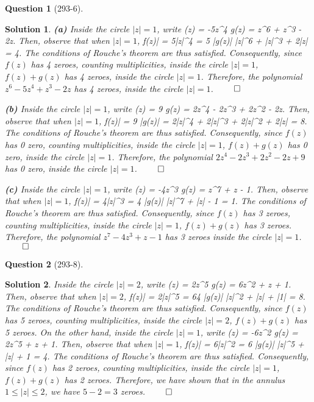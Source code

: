 \documentclass{article} %
\def\eQb#1\eQe{\begin{eqnarray*}#1\end{eqnarray*}}
\theoremstyle{quest}
\newtheorem*{question}{Question}
\newtheorem*{solution}{Solution}
\begin{document}
\begin{question}[293-6]
\end{question}
\begin{solution}
\textbf{(a)}
Inside the circle $|z| = 1$, write 
\eQb
f(z) = -5z^4 \>  \> g(z) = z^6 + z^3 - 2z.
\eQe
Then, observe that when $|z| = 1$,
\eQb
|f(z)| = 5|z|^4 = 5 \>  \> |g(z)| \leq |z|^6 + |z|^3 + 2|z| = 4.
\eQe
The conditions of Rouche's theorem are thus satisfied. Consequently, 
since $f(z)$ has 4 zeroes, counting multiplicities, inside the circle $|z| 
=1$, $f(z) + g(z)$ has 4 zeroes, inside the circle $|z| = 1$.
Therefore, the polynomial $z^6 -
5z^4 + z^3 - 2z$ has 4 zeroes, inside the circle $|z| = 1$.
\hfill $\qed$

\smallskip

\textbf{(b)}
Inside the circle $|z| = 1$, write
\eQb
f(z) = 9 \>  \> g(z) = 2z^4 - 2z^3 + 2z^2 - 2z.
\eQe 
Then, observe that when $|z| = 1$,
\eQb
|f(z)| = 9 \>  \> |g(z)| = 2|z|^4 + 2|z|^3 + 2|z|^2 + 2|z| = 8.
\eQe
The conditions of Rouche's theorem are thus satisfied. Consequently,
since $f(z)$ has 0 zero, counting multiplicities, inside the circle $|z| = 1$,
$f(z) + g(z)$ has 0 zero, inside the circle $|z| = 1$. Therefore, 
the polynomial $2z^4 - 2z^3 + 2z^2 - 2z + 9$ has 0 zero, inside
the circle $|z| = 1$.
\hfill $\qed$

\smallskip
\textbf{(c)} 
Inside the circle $|z| = 1$, write
\eQb
f(z) = -4z^3 \>  \> g(z) = z^7 + z - 1. 
\eQe
Then, observe that when $|z| = 1$, 
\eQb
|f(z)| = 4|z|^3 = 4 \>  |g(z)| \leq |z|^7 + |z| - 1 = 1.
\eQe
The conditions of Rouche's theorem are thus satisfied. Consequently,
since $f(z)$ has 3 zeroes, counting multiplicities, inside the circle
$|z| = 1$, $f(z) + g(z)$ has 3 zeroes. Therefore, the polynomial 
$z^7 - 4z^3 + z - 1$ has 3 zeroes inside the circle $|z| = 1$.
\hfill $\qed$

\end{solution}

\bigskip

\begin{question}[293-8]
\end{question}
\begin{solution}
Inside the circle $|z| = 2$, write
\eQb
f(z) = 2z^5 \>  \> g(z) = 6z^2 + z + 1.
\eQe
Then, observe that when $|z| = 2$,
\eQb
|f(z)| = 2|z|^5 = 64 \>  |g(z)| |z|^2 + |z| + |1| = 8.
\eQe
The conditions of Rouche's theorem are thus satisfied. Consequently, since
$f(z)$ has 5 zeroes, counting multiplicities, inside the circle $|z| = 2$,
$f(z) + g(z)$ has 5 zeroes. On the other hand, inside the circle $|z| = 1$,
write
\eQb
f(z) = -6z^2 \>  \> g(z) = 2z^5 + z + 1.
\eQe
Then, observe that when $|z| = 1$,
\eQb
|f(z)| = 6|z|^2 = 6 \>  |g(z)| |z|^5 + |z| + 1 = 4.
\eQe
The conditions of Rouche's theorem are thus satisfied. Consequently, since
$f(z)$ has 2 zeroes, counting multiplicities, inside the circle $|z| = 1 $,
$f(z) + g(z)$ has 2 zeroes. Therefore, we have shown that
in the annulus $1 \leq |z| \leq 2$, we have $5 - 2 = 3$ zeroes. 
\hfill $\qed$
\end{solution}
\end{document}
